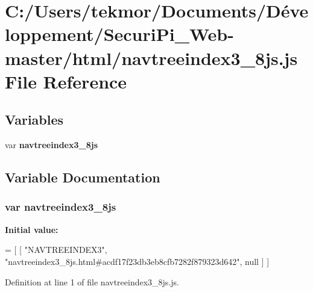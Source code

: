 \section{C\+:/\+Users/tekmor/\+Documents/\+Développement/\+Securi\+Pi\+\_\+\+Web-\/master/html/navtreeindex3\+\_\+8js.js File Reference}
\label{navtreeindex3__8js_8js}
\subsection*{Variables}
\begin{DoxyCompactItemize}
\item 
var {\bf navtreeindex3\+\_\+8js}
\end{DoxyCompactItemize}


\subsection{Variable Documentation}
\subsubsection[{navtreeindex3\+\_\+8js}]{\setlength{\rightskip}{0pt plus 5cm}var navtreeindex3\+\_\+8js}\label{navtreeindex3__8js_8js_a5d5292cbd271b02e752993b267c6e1be}
{\bfseries Initial value\+:}
\begin{DoxyCode}
=
[
    [ \textcolor{stringliteral}{"NAVTREEINDEX3"}, \textcolor{stringliteral}{"navtreeindex3\_8js.html#acdf17f23db3eb8cfb7282f879323d642"}, null ]
]
\end{DoxyCode}


Definition at line 1 of file navtreeindex3\+\_\+8js.\+js.

